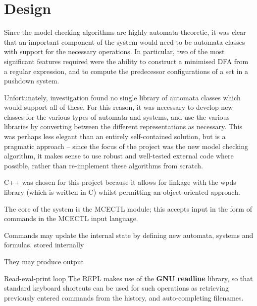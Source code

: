 \documentclass[11pt]{article}
\theoremstyle{definition}
\begin{document}
\section{Design}



Since the model checking algorithms are highly automata-theoretic, it was clear
that an important component of the system would need to be automata classes
with support for the necessary operations. In particular, two of the most
significant features required were the ability to construct a minimised DFA from a
regular expression, and to compute the predecessor configurations of a set in a
pushdown system. %

Unfortunately, investigation found no single library of automata classes which
would support all of these. For this reason, it was necessary to develop new
classes for the various types of automata and systems, and use the various
libraries by converting between the different representations as necessary.
This was perhaps less elegant than an entirely self-contained solution, but is
a pragmatic approach -- since the focus of the project was the new model
checking algorithm, it makes sense to use robust and well-tested external code
where possible, rather than re-implement these algorithms from scratch.


C++ was chosen for this project because it allows for linkage with the wpds
library (which is written in C) whilst permitting an object-oriented approach.







The core of the system is the MCECTL module; this accepts input in the form of commands in the MCECTL input language. 

Commands may update the internal state by defining new automata, systems and formulas.
stored internally

They may produce output

Read-eval-print loop
The REPL makes use of the \textbf{GNU readline} library, so that standard
keyboard shortcuts can be used for such operations as retrieving previously
entered commands from the history, and auto-completing filenames. 
\end{document}
